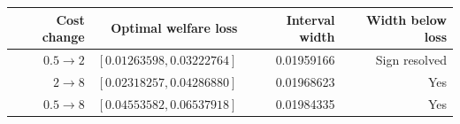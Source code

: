 \begin{tabular}{rrrr}
\toprule
Cost change & Optimal welfare loss & Interval width & Width below loss \\
\midrule
$0.5\to2$ & $[0.01263598,0.03222764]$ & 0.01959166 & Sign resolved \\
$2\to8$ & $[0.02318257,0.04286880]$ & 0.01968623 & Yes \\
$0.5\to8$ & $[0.04553582,0.06537918]$ & 0.01984335 & Yes \\
\bottomrule
\end{tabular}
